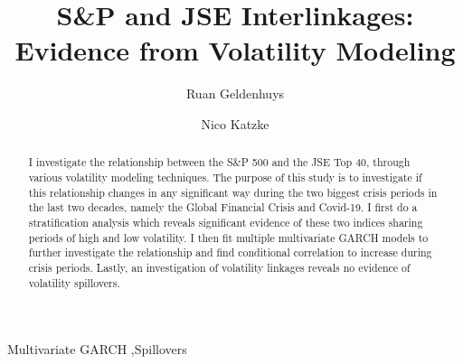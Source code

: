 \documentclass[11pt,preprint, authoryear]{elsarticle}
\numberwithin{equation}{section}
\numberwithin{figure}{section}
\numberwithin{table}{section}
\begin{document}
\begin{frontmatter}  %

\title{S\&P and JSE Interlinkages: Evidence from Volatility Modeling}





\author[Add1]{Ruan Geldenhuys}

\author[Add1,Add2]{Nico Katzke}




\address[Add1]{Stellenbosch University, Stellenbosch, South Africa}
\address[Add2]{Stellenbosch University, Stellenbosch, South Africa}


\begin{abstract}
\small{
I investigate the relationship between the S\&P 500 and the JSE Top 40,
through various volatility modeling techniques. The purpose of this
study is to investigate if this relationship changes in any significant
way during the two biggest crisis periods in the last two decades,
namely the Global Financial Crisis and Covid-19. I first do a
stratification analysis which reveals significant evidence of these two
indices sharing periods of high and low volatility. I then fit multiple
multivariate GARCH models to further investigate the relationship and
find conditional correlation to increase during crisis periods. Lastly,
an investigation of volatility linkages reveals no evidence of
volatility spillovers.
}
\end{abstract}

\vspace{1cm}


\begin{keyword}
\footnotesize{
Multivariate GARCH \sep Spillovers \\
\vspace{0.3cm}
}
\end{keyword}



\vspace{0.5cm}

\end{frontmatter}

\setcounter{footnote}{0}



\pagestyle{fancy}
\chead{}
\rhead{}
\lfoot{}
\lhead{}
\cfoot{}
\end{document}
